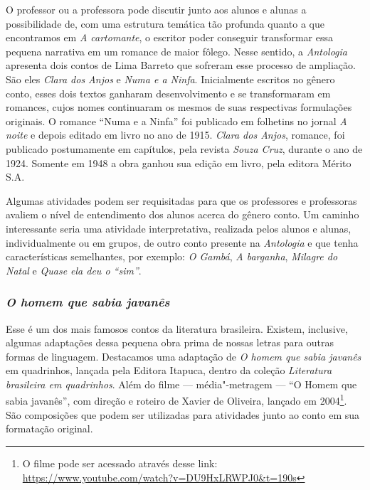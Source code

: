 \documentclass{extarticle}
\begin{document}
O professor ou a professora pode discutir junto aos alunos e alunas a
possibilidade de, com uma estrutura temática tão profunda quanto a que
encontramos em {\textit{A cartomante}}, o escritor poder conseguir
transformar essa pequena narrativa em um romance de maior fôlego. Nesse
sentido, a \emph{Antologia} apresenta dois contos de Lima Barreto que
sofreram esse processo de ampliação. São eles {\textit{Clara dos
Anjos}} e {\textit{Numa e a Ninfa}}. Inicialmente escritos no
gênero conto, esses dois textos ganharam desenvolvimento e se
transformaram em romances, cujos nomes continuaram os mesmos de suas
respectivas formulações originais. O romance ``Numa e a Ninfa'' foi
publicado em folhetins no jornal \emph{A noite} e depois editado em
livro no ano de 1915. \emph{Clara dos Anjos}, romance, foi publicado
postumamente em capítulos, pela revista \emph{Souza Cruz}, durante o ano
de 1924. Somente em 1948 a obra ganhou sua edição em livro, pela editora
Mérito S.A.










Algumas atividades podem ser requisitadas para que os professores e
professoras avaliem o nível de entendimento dos alunos acerca do gênero
conto. Um caminho interessante seria uma atividade interpretativa,
realizada pelos alunos e alunas, individualmente ou em grupos, de outro
conto presente na \emph{Antologia} e que tenha características
semelhantes, por exemplo: {\textit{O Gambá}}, {\textit{A
barganha}}, {\textit{Milagre do Natal}} e {\textit{Quase ela
deu o ``sim''}}.

\subsubsection{\textit{O homem que sabia javanês}}

Esse é um dos mais famosos contos da literatura brasileira. Existem,
inclusive, algumas adaptações dessa pequena obra prima de nossas letras
para outras formas de linguagem. Destacamos uma adaptação de
{\textit{O homem que sabia javanês}} em quadrinhos, lançada pela
Editora Itapuca, dentro da coleção \emph{Literatura brasileira em
quadrinhos}. Além do filme --- média"-metragem --- ``O Homem que sabia
javanês'', com direção e roteiro de Xavier de Oliveira, lançado em
2004\footnote{O filme pode ser acessado através desse link:
  \url{https://www.youtube.com/watch?v=DU9HxLRWPJ0\&t=190s}}. São
composições que podem ser utilizadas para atividades junto ao conto em
sua formatação original.
\end{document}
